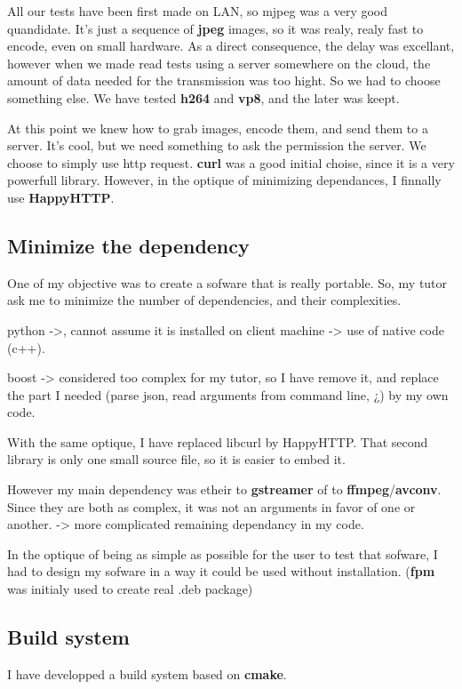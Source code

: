 \documentclass[a4paper,11pt]{custom}
\newcommand{\avconv}{\textbf{avconv}}
\newcommand{\ffmpeg}{\textbf{ffmpeg}}
\newcommand{\gstreamer}{\textbf{gstreamer}}
\newcommand{\curl}{\textbf{curl}}
\newcommand{\happyhttp}{\textbf{HappyHTTP}}
\newcommand{\jpeg}{\textbf{jpeg}}
\newcommand{\vpx}{\textbf{vp8}}
\newcommand{\mpeg}{\textbf{h264}}
\newcommand{\cmake}{\textbf{cmake}}
\newcommand{\fpm}{\textbf{fpm}}
\begin{document}
All our tests have been first made on LAN, so mjpeg was a very good quandidate.
It's just a sequence of \jpeg{} images, so it was realy, realy fast to encode,
even on small hardware. As a direct consequence, the delay was excellant,
however when we made read tests using a server somewhere on the cloud, the
amount of data needed for the transmission was too hight. So we had to choose
something else. We have tested \mpeg{} and \vpx, and the later was keept.

At this point we knew how to grab images, encode them, and send them to a
server. It's cool, but we need something to ask the permission the server. We
choose to simply use http request. \curl{} was a good initial choise, since it is
a very powerfull library. However, in the optique of minimizing dependances, I
finnally use \happyhttp.

\subsection{Minimize the dependency}

One of my objective was to create a sofware that is really portable. So, my
tutor ask me to minimize the number of dependencies, and their complexities.

python ->, cannot assume it is installed on client machine -> use of native code
(c++).

boost -> considered too complex for my tutor, so I have remove it, and replace
the part I needed (parse json, read arguments from command line, ¿) by my own
code.

With the same optique, I have replaced libcurl by HappyHTTP. That second library
is only one small source file, so it is easier to embed it.

However my main dependency was etheir to \gstreamer{} of to \ffmpeg/\avconv. Since
they are both as complex, it was not an arguments in favor of one or another.
-> more complicated remaining dependancy in my code.

In the optique of being as simple as possible for the user to test that sofware,
I had to design my sofware in a way it could be used without installation.
(\fpm{} was initialy used to create real .deb package)

\subsection{Build system}

I have developped a build system based on \cmake.
\end{document}
